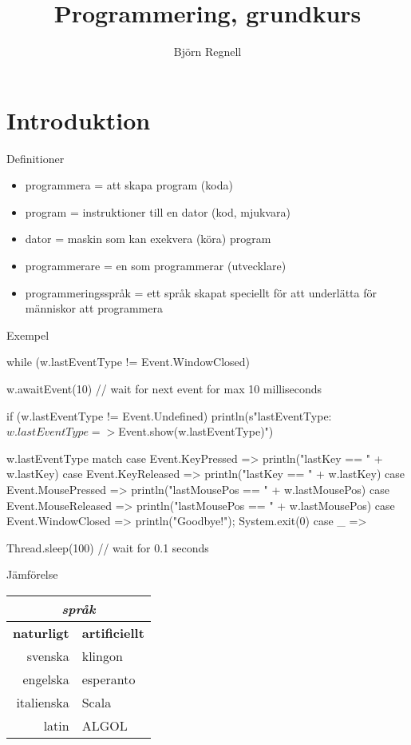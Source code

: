\documentclass{simpleslides}
\title{Programmering, grundkurs}
\author{Björn Regnell}
\date{}
\renewcommand{\vecka}{1}
\begin{document}
\frame{\titlepage}
\setnextsection{\vecka}


\frame{\tableofcontents}

\section{Introduktion}

\begin{Slide}{Definitioner}
  \begin{itemize}
    \item programmera = \pause att skapa program (koda) \pause 
    \item program = instruktioner till en dator (kod, mjukvara) \pause
    \item dator = maskin som kan exekvera (köra) program \pause
    \item programmerare = en som programmerar (utvecklare) \pause
    \item programmeringsspråk = ett språk skapat speciellt för att underlätta för människor att programmera
  \end{itemize}
\end{Slide}



\begin{Slide}{Exempel} %
\begin{Code}
  while (w.lastEventType != Event.WindowClosed) {
    w.awaitEvent(10)  // wait for next event for max 10 milliseconds

    if (w.lastEventType != Event.Undefined) {
      println(s"lastEventType: ${w.lastEventType} => ${Event.show(w.lastEventType)}")
    }

    w.lastEventType match {
      case Event.KeyPressed    => println("lastKey == " + w.lastKey)
      case Event.KeyReleased   => println("lastKey == " + w.lastKey)
      case Event.MousePressed  => println("lastMousePos == " + w.lastMousePos)
      case Event.MouseReleased => println("lastMousePos == " + w.lastMousePos)
      case Event.WindowClosed  => println("Goodbye!"); System.exit(0)
      case _ =>
    }

    Thread.sleep(100) // wait for 0.1 seconds
  }
\end{Code}
\end{Slide}

\begin{Slide}{Jämförelse} %
\begin{table}
  \centering\Large
  \begin{tabular}{r | l}
    \multicolumn{2}{c}{\textit{språk}}\\\hline 
    \textbf{naturligt} & \textbf{artificiellt} \\ \pause
    svenska & klingon \\
    engelska & esperanto \\
    italienska & Scala \\
    latin & ALGOL  \\
  \end{tabular}
\end{table}
\end{Slide}
\end{document}
